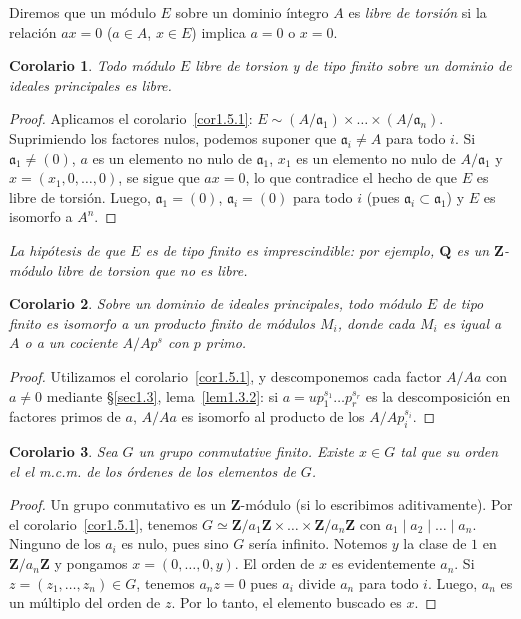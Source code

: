 \documentclass[10pt,oneside,bibtotoc,smallheadings,leqno,a5paper,DIV=12]{scrbook}
\newcommand{\QQ}{\mathbf{Q}}
\newcommand{\ZZ}{\mathbf{Z}}
\newcommand{\idl}[1]{\mathfrak{#1}}
\numberwithin{equation}{section}
\newenvironment{comm}%
	{\begin{trivlist}\item\small\itshape}
	{\end{trivlist}}
\theoremstyle{defi}
\theoremstyle{enonce}
\newtheorem{corollary}{Corolario}
\theoremstyle{rem}
\numberwithin{theorem}{section}
\numberwithin{proposition}{section}
\numberwithin{definition}{section}
\numberwithin{lemma}{section}
\numberwithin{corollary}{section}
\numberwithin{example}{section}
\numberwithin{footnote}{section}%
\begin{document}
Diremos que un m\'odulo $E$ sobre un dominio \'integro $A$ es
{\em libre de torsi\'on} si la relaci\'on $ax = 0$
($a\in A$, $x\in E$) implica $a = 0$ o $x = 0$.

\begin{corollary}
Todo m\'odulo $E$ libre de torsion y de tipo finito
sobre un dominio de ideales principales es libre.
\end{corollary}

\begin{proof}
Aplicamos el corolario~\ref{cor1.5.1}: $E \sim (A/\idl{a}_{1})\times\dots
\times (A/\idl{a}_{n})$. Suprimiendo los factores nulos, podemos
suponer que $\idl{a}_{i}\neq A$ para todo $i$. Si $\idl{a}_{1}\neq(0)$,
$a$ es un elemento no nulo de $\idl{a}_{1}$,
$x_{1}$ es un elemento no nulo de $A/\idl{a}_{1}$ y
$x = (x_{1},0,\dots,0)$, se sigue que $ax = 0$, lo que contradice
el hecho de que $E$ es libre de torsi\'on. Luego,
$\idl{a}_{1} = (0)$, $\idl{a}_{i} = (0)$ para todo $i$ (pues
$\idl{a}_{i}\subset\idl{a}_{1}$) y $E$ es isomorfo a $A^{n}$.
\end{proof}

\begin{comm}
La hip\'otesis de que $E$ es de tipo finito es imprescindible:
por ejemplo, $\QQ$ es un $\ZZ$-m\'odulo libre de torsion que no
es libre.
\end{comm}

\begin{corollary}
Sobre un dominio de ideales principales, todo m\'odulo $E$
de tipo finito es isomorfo a un producto finito de m\'odulos
$M_{i}$, donde cada $M_{i}$ es igual a $A$ o a un cociente
$A/Ap^{s}$ con $p$ primo.
\end{corollary}

\begin{proof}
Utilizamos el corolario~\ref{cor1.5.1}, y descomponemos cada factor
$A/Aa$ con $a\neq 0$ mediante \S\ref{sec1.3}, lema~\ref{lem1.3.2}: si
$a = up_{1}^{s_{1}}\dots p_{r}^{s_{r}}$ es la
descomposici\'on en factores primos de $a$, $A/Aa$ es
isomorfo al producto de los $A/Ap_{i}^{s_{i}}$.
\end{proof}

\begin{corollary}\label{cor1.5.4}
Sea $G$ un grupo conmutative finito. Existe $x\in G$ tal que
su orden el el m.c.m. de los \'ordenes de los elementos de $G$.
\end{corollary}

\begin{proof}
Un grupo conmutativo es un $\ZZ$-m\'odulo (si lo escribimos
aditivamente). Por el corolario~\ref{cor1.5.1}, tenemos $G \simeq
\ZZ/a_{1}\ZZ\times\dots\times\ZZ/a_{n}\ZZ$ con
$a_{1}\mid a_{2}\mid\dots\mid a_{n}$. Ninguno de los $a_{i}$
es nulo, pues sino $G$ ser\'ia infinito. Notemos $y$ la
clase de $1$ en $\ZZ/a_{n}\ZZ$ y pongamos $x = (0,\dots,0,y)$.
El orden de $x$ es evidentemente $a_{n}$. Si $z = (z_{1},\dots,z_{n})\in G$,
tenemos $a_{n}z = 0$ pues $a_{i}$ divide $a_{n}$ para todo $i$.
Luego, $a_{n}$ es un m\'ultiplo del orden de $z$. Por lo tanto, el
elemento buscado es $x$.
\end{proof}
\end{document}
